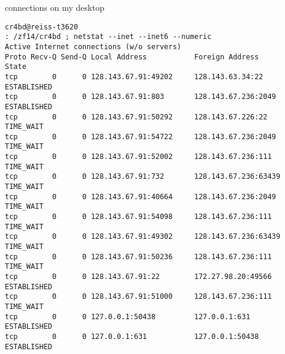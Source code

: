 
\begin{frame}[fragile,label=laptopNetstat]{connections on my desktop}
\begin{lstlisting}[language={},basicstyle=\fontsize{9.5}{10.5}\selectfont]
cr4bd@reiss-t3620
: /zf14/cr4bd ; netstat --inet --inet6 --numeric
Active Internet connections (w/o servers)
Proto Recv-Q Send-Q Local Address           Foreign Address         State      
tcp        0      0 128.143.67.91:49202     128.143.63.34:22        ESTABLISHED
tcp        0      0 128.143.67.91:803       128.143.67.236:2049     ESTABLISHED
tcp        0      0 128.143.67.91:50292     128.143.67.226:22       TIME_WAIT  
tcp        0      0 128.143.67.91:54722     128.143.67.236:2049     TIME_WAIT  
tcp        0      0 128.143.67.91:52002     128.143.67.236:111      TIME_WAIT  
tcp        0      0 128.143.67.91:732       128.143.67.236:63439    TIME_WAIT  
tcp        0      0 128.143.67.91:40664     128.143.67.236:2049     TIME_WAIT  
tcp        0      0 128.143.67.91:54098     128.143.67.236:111      TIME_WAIT  
tcp        0      0 128.143.67.91:49302     128.143.67.236:63439    TIME_WAIT  
tcp        0      0 128.143.67.91:50236     128.143.67.236:111      TIME_WAIT  
tcp        0      0 128.143.67.91:22        172.27.98.20:49566      ESTABLISHED
tcp        0      0 128.143.67.91:51000     128.143.67.236:111      TIME_WAIT  
tcp        0      0 127.0.0.1:50438         127.0.0.1:631           ESTABLISHED
tcp        0      0 127.0.0.1:631           127.0.0.1:50438         ESTABLISHED
\end{lstlisting}
\end{frame}


